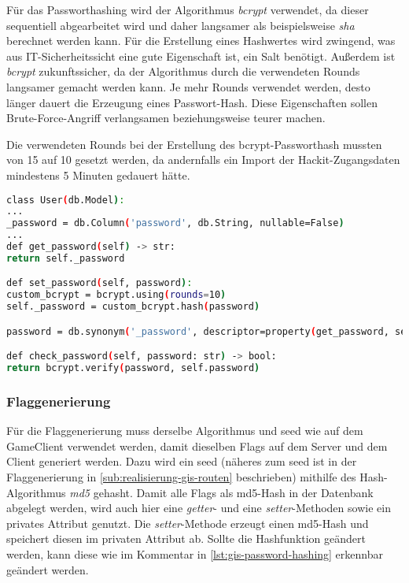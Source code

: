 Für das Passworthashing wird der Algorithmus \textit{bcrypt} verwendet, da dieser sequentiell abgearbeitet wird und daher langsamer als beispielsweise  \textit{sha} berechnet werden kann. Für die Erstellung eines Hashwertes wird zwingend, was aus IT-Sicherheitssicht eine gute Eigenschaft ist, ein Salt benötigt. Außerdem ist \textit{bcrypt} zukunftssicher, da der Algorithmus durch die verwendeten Rounds langsamer gemacht werden kann. Je mehr Rounds verwendet werden, desto länger dauert die Erzeugung eines Passwort-Hash. Diese Eigenschaften sollen Brute-Force-Angriff verlangsamen beziehungsweise teurer machen.

Die verwendeten Rounds bei der Erstellung des bcrypt-Passworthash mussten von 15 auf 10 gesetzt werden, da andernfalls ein Import der Hackit-Zugangsdaten mindestens 5 Minuten gedauert hätte.

\begin{lstlisting}[language=bash, frame=single, caption={GIS Nutzerpasswort}, captionpos=b, label={lst:gis-orm-model}]
class User(db.Model):
...
_password = db.Column('password', db.String, nullable=False)
...
def get_password(self) -> str:
return self._password

def set_password(self, password):
custom_bcrypt = bcrypt.using(rounds=10)
self._password = custom_bcrypt.hash(password)

password = db.synonym('_password', descriptor=property(get_password, set_password))

def check_password(self, password: str) -> bool:
return bcrypt.verify(password, self.password)
\end{lstlisting}

\subsubsection{Flaggenerierung}\label{subsub:realisierung-gis-flag-hash}
Für die Flaggenerierung muss derselbe Algorithmus und seed wie auf dem GameClient verwendet werden, damit dieselben Flags auf dem Server und dem Client generiert werden. Dazu wird ein seed (näheres zum seed ist in der Flaggenerierung in \autoref{sub:realisierung-gis-routen} beschrieben) mithilfe des Hash-Algorithmus \textit{md5} gehasht. Damit alle Flags als md5-Hash in der Datenbank abgelegt werden, wird auch hier eine \textit{getter}- und eine \textit{setter}-Methoden sowie ein privates Attribut genutzt. Die \textit{setter}-Methode erzeugt einen md5-Hash und speichert diesen im privaten Attribut ab. Sollte die Hashfunktion geändert werden, kann diese wie im Kommentar in \autoref{lst:gis-password-hashing} erkennbar geändert werden.

